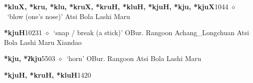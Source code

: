   \begin{list}{}{\leftmargin=1.5em \itemindent=-1.5em}
  \item {\footnotesize \textbf{*kluX, *kru, *klu, *kruX, *kruH, *kluH, *kjuH, *kju, *kjuX}}{\tiny 1044}
         $\diamond$~`blow (one's nose)'
         Atsi 
\hspace{1ex}
         Bola 
\hspace{1ex}
         Lashi 
\hspace{1ex}
         Maru 
  \item {\footnotesize \textbf{*kjuH}}{\tiny 10231}
\hspace{1ex}
         $\diamond$~`snap / break (a stick)'
         OBur. 
\hspace{1ex}
         Rangoon 
\hspace{1ex}
         Achang\_Longchuan 
\hspace{1ex}
         Atsi 
\hspace{1ex}
         Bola 
\hspace{1ex}
         Lashi 
\hspace{1ex}
         Maru 
\hspace{1ex}
         Xiandao 
  \item {\footnotesize \textbf{*kju, *ʔkju}}{\tiny 5503}
\hspace{1ex}
         $\diamond$~`horn'
         OBur. 
\hspace{1ex}
         Rangoon 
\hspace{1ex}
         Atsi 
\hspace{1ex}
         Bola 
\hspace{1ex}
         Lashi 
\hspace{1ex}
         Maru 
  \item {\footnotesize \textbf{*kjuH, *kruH, *kluH}}{\tiny 1420}
\hspace{1ex}

\end{list}
